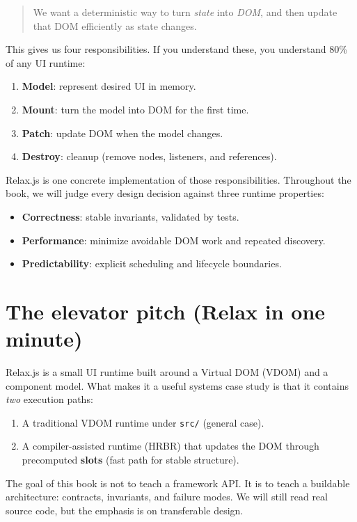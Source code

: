 \begin{quote}
We want a deterministic way to turn \emph{state} into \emph{DOM}, and then update that DOM efficiently as state changes.
\end{quote}

This gives us four responsibilities.
If you understand these, you understand 80\% of any UI runtime:

\begin{enumerate}
  \item \textbf{Model}: represent desired UI in memory.
  \item \textbf{Mount}: turn the model into DOM for the first time.
  \item \textbf{Patch}: update DOM when the model changes.
  \item \textbf{Destroy}: cleanup (remove nodes, listeners, and references).
\end{enumerate}

Relax.js is one concrete implementation of those responsibilities.
Throughout the book, we will judge every design decision against three runtime properties:

\begin{itemize}
  \item \textbf{Correctness}: stable invariants, validated by tests.
  \item \textbf{Performance}: minimize avoidable DOM work and repeated discovery.
  \item \textbf{Predictability}: explicit scheduling and lifecycle boundaries.
\end{itemize}

\section{The elevator pitch (Relax in one minute)}
Relax.js is a small UI runtime built around a Virtual DOM (VDOM) and a component model.
What makes it a useful systems case study is that it contains \emph{two} execution paths:

\begin{enumerate}
  \item A traditional VDOM runtime under \texttt{src/} (general case).
  \item A compiler-assisted runtime (HRBR) that updates the DOM through precomputed \textbf{slots} (fast path for stable structure).
\end{enumerate}

The goal of this book is not to teach a framework API.
It is to teach a buildable architecture: contracts, invariants, and failure modes.
We will still read real source code, but the emphasis is on transferable design.

